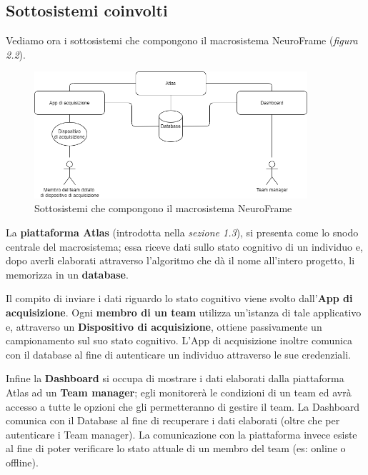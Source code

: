 \subsection{Sottosistemi coinvolti}
Vediamo ora i sottosistemi che compongono il macrosistema NeuroFrame (\emph{figura 2.2}).\newline
\begin{figure}[H]
  \centering
  \includegraphics[width=0.9\textwidth]{img/NeuroFrameBase.png}
  \caption{Sottosistemi che compongono il macrosistema NeuroFrame}
\end{figure}

\noindent La {\bf piattaforma Atlas} (introdotta nella \emph{sezione 1.3}), si presenta come lo snodo centrale del macrosistema; essa riceve dati sullo stato cognitivo di un individuo e, dopo averli elaborati attraverso l'algoritmo che dà il nome all'intero progetto, li memorizza in un {\bf database}.\newline

\noindent Il compito di inviare i dati riguardo lo stato cognitivo viene svolto dall'{\bf App di acquisizione}. Ogni {\bf membro di un team} utilizza un'istanza di tale applicativo e, attraverso un {\bf Dispositivo di acquisizione}, ottiene passivamente un campionamento sul suo stato cognitivo. L'App di acquisizione inoltre comunica con il database al fine di autenticare un individuo attraverso le sue credenziali.\newline

\noindent Infine la {\bf Dashboard} si occupa di mostrare i dati elaborati dalla piattaforma Atlas ad un {\bf Team manager}; egli monitorerà le condizioni di un team ed avrà accesso a tutte le opzioni che gli permetteranno di gestire il team. La Dashboard comunica con il Database al fine di recuperare i dati elaborati (oltre che per autenticare i Team manager). La comunicazione con la piattaforma invece esiste al fine di poter verificare lo stato attuale di un membro del team (es: online o offline).\newline

